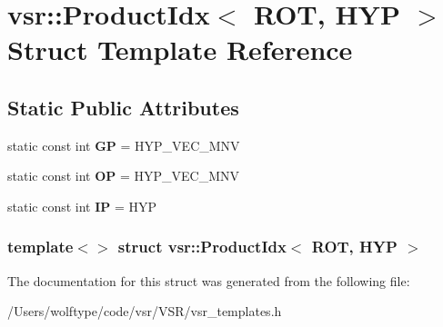 \hypertarget{structvsr_1_1_product_idx_3_01_r_o_t_00_01_h_y_p_01_4}{\section{vsr\-:\-:Product\-Idx$<$ R\-O\-T, H\-Y\-P $>$ Struct Template Reference}
\label{structvsr_1_1_product_idx_3_01_r_o_t_00_01_h_y_p_01_4}
}
\subsection*{Static Public Attributes}
\begin{DoxyCompactItemize}
\item 
\hypertarget{structvsr_1_1_product_idx_3_01_r_o_t_00_01_h_y_p_01_4_ad488b8bcaf386d4606870b4b6188faeb}{static const int {\bfseries G\-P} = H\-Y\-P\-\_\-\-V\-E\-C\-\_\-\-M\-N\-V}\label{structvsr_1_1_product_idx_3_01_r_o_t_00_01_h_y_p_01_4_ad488b8bcaf386d4606870b4b6188faeb}

\item 
\hypertarget{structvsr_1_1_product_idx_3_01_r_o_t_00_01_h_y_p_01_4_af14fec9af17b6a55b8e62ba5535e6e1f}{static const int {\bfseries O\-P} = H\-Y\-P\-\_\-\-V\-E\-C\-\_\-\-M\-N\-V}\label{structvsr_1_1_product_idx_3_01_r_o_t_00_01_h_y_p_01_4_af14fec9af17b6a55b8e62ba5535e6e1f}

\item 
\hypertarget{structvsr_1_1_product_idx_3_01_r_o_t_00_01_h_y_p_01_4_a25bd562b5e57395786b8b7be8914229b}{static const int {\bfseries I\-P} = H\-Y\-P}\label{structvsr_1_1_product_idx_3_01_r_o_t_00_01_h_y_p_01_4_a25bd562b5e57395786b8b7be8914229b}

\end{DoxyCompactItemize}
\subsubsection*{template$<$$>$ struct vsr\-::\-Product\-Idx$<$ R\-O\-T, H\-Y\-P $>$}



The documentation for this struct was generated from the following file\-:\begin{DoxyCompactItemize}
\item 
/\-Users/wolftype/code/vsr/\-V\-S\-R/vsr\-\_\-templates.\-h\end{DoxyCompactItemize}
